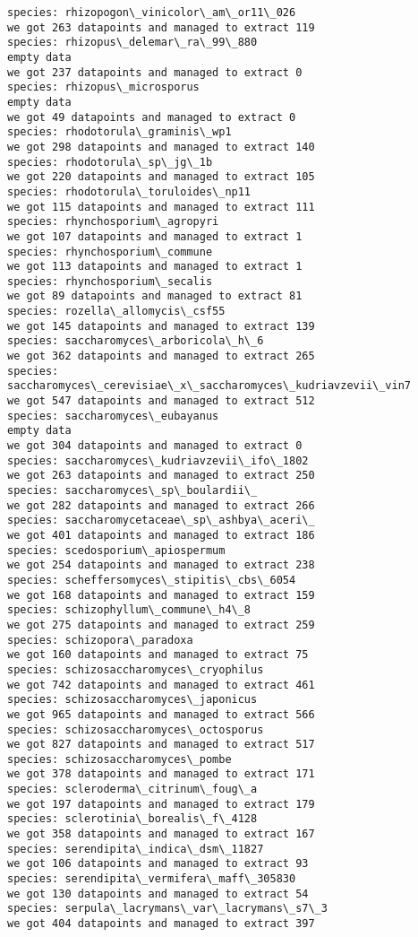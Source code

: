 \documentclass[11pt]{article}
\begin{document}
\begin{Verbatim}[commandchars=\\\{\}]
species: rhizopogon\_vinicolor\_am\_or11\_026
we got 263 datapoints and managed to extract 119
species: rhizopus\_delemar\_ra\_99\_880
empty data
we got 237 datapoints and managed to extract 0
species: rhizopus\_microsporus
empty data
we got 49 datapoints and managed to extract 0
species: rhodotorula\_graminis\_wp1
we got 298 datapoints and managed to extract 140
species: rhodotorula\_sp\_jg\_1b
we got 220 datapoints and managed to extract 105
species: rhodotorula\_toruloides\_np11
we got 115 datapoints and managed to extract 111
species: rhynchosporium\_agropyri
we got 107 datapoints and managed to extract 1
species: rhynchosporium\_commune
we got 113 datapoints and managed to extract 1
species: rhynchosporium\_secalis
we got 89 datapoints and managed to extract 81
species: rozella\_allomycis\_csf55
we got 145 datapoints and managed to extract 139
species: saccharomyces\_arboricola\_h\_6
we got 362 datapoints and managed to extract 265
species: saccharomyces\_cerevisiae\_x\_saccharomyces\_kudriavzevii\_vin7
we got 547 datapoints and managed to extract 512
species: saccharomyces\_eubayanus
empty data
we got 304 datapoints and managed to extract 0
species: saccharomyces\_kudriavzevii\_ifo\_1802
we got 263 datapoints and managed to extract 250
species: saccharomyces\_sp\_boulardii\_
we got 282 datapoints and managed to extract 266
species: saccharomycetaceae\_sp\_ashbya\_aceri\_
we got 401 datapoints and managed to extract 186
species: scedosporium\_apiospermum
we got 254 datapoints and managed to extract 238
species: scheffersomyces\_stipitis\_cbs\_6054
we got 168 datapoints and managed to extract 159
species: schizophyllum\_commune\_h4\_8
we got 275 datapoints and managed to extract 259
species: schizopora\_paradoxa
we got 160 datapoints and managed to extract 75
species: schizosaccharomyces\_cryophilus
we got 742 datapoints and managed to extract 461
species: schizosaccharomyces\_japonicus
we got 965 datapoints and managed to extract 566
species: schizosaccharomyces\_octosporus
we got 827 datapoints and managed to extract 517
species: schizosaccharomyces\_pombe
we got 378 datapoints and managed to extract 171
species: scleroderma\_citrinum\_foug\_a
we got 197 datapoints and managed to extract 179
species: sclerotinia\_borealis\_f\_4128
we got 358 datapoints and managed to extract 167
species: serendipita\_indica\_dsm\_11827
we got 106 datapoints and managed to extract 93
species: serendipita\_vermifera\_maff\_305830
we got 130 datapoints and managed to extract 54
species: serpula\_lacrymans\_var\_lacrymans\_s7\_3
we got 404 datapoints and managed to extract 397

\end{Verbatim}
\end{document}
